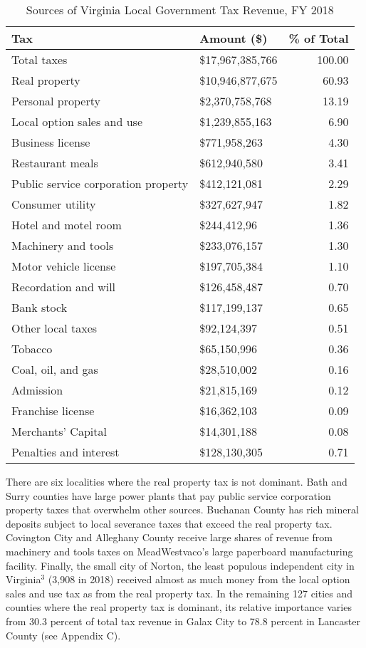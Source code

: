 \documentclass[
]{book}
\begin{document}
\begin{table}

\caption{\label{tab:unnamed-chunk-2}Sources of Virginia Local Government Tax Revenue, FY 2018}
\centering
\begin{tabular}[t]{l|l|r}
\hline
Tax & Amount (\$) & \% of Total\\
\hline
Total taxes & \$17,967,385,766 & 100.00\\
\hline
Real property & \$10,946,877,675 & 60.93\\
\hline
Personal property & \$2,370,758,768 & 13.19\\
\hline
Local option sales and use & \$1,239,855,163 & 6.90\\
\hline
Business license & \$771,958,263 & 4.30\\
\hline
Restaurant meals & \$612,940,580 & 3.41\\
\hline
Public service corporation property & \$412,121,081 & 2.29\\
\hline
Consumer utility & \$327,627,947 & 1.82\\
\hline
Hotel and motel room & \$244,412,96 & 1.36\\
\hline
Machinery and tools & \$233,076,157 & 1.30\\
\hline
Motor vehicle license & \$197,705,384 & 1.10\\
\hline
Recordation and will & \$126,458,487 & 0.70\\
\hline
Bank stock & \$117,199,137 & 0.65\\
\hline
Other local taxes & \$92,124,397 & 0.51\\
\hline
Tobacco & \$65,150,996 & 0.36\\
\hline
Coal, oil, and gas & \$28,510,002 & 0.16\\
\hline
Admission & \$21,815,169 & 0.12\\
\hline
Franchise license & \$16,362,103 & 0.09\\
\hline
Merchants' Capital & \$14,301,188 & 0.08\\
\hline
Penalties and interest & \$128,130,305 & 0.71\\
\hline
\end{tabular}
\end{table}

There are six localities where the real property tax is not dominant. Bath and Surry counties have large power plants that pay public service corporation property taxes that overwhelm other sources. Buchanan County has rich mineral deposits subject to local severance taxes that exceed the real property tax. Covington City and Alleghany County receive large shares of revenue from machinery and tools taxes on MeadWestvaco's large paperboard manufacturing facility. Finally, the small city of Norton, the least populous independent city in Virginia\(^3\) (3,908 in 2018) received almost as much money from the local option sales and use tax as from the real property tax. In the remaining 127 cities and counties where the real property tax is dominant, its relative importance varies from 30.3 percent of total tax revenue in Galax City to 78.8 percent in Lancaster County (see Appendix C).
\end{document}
